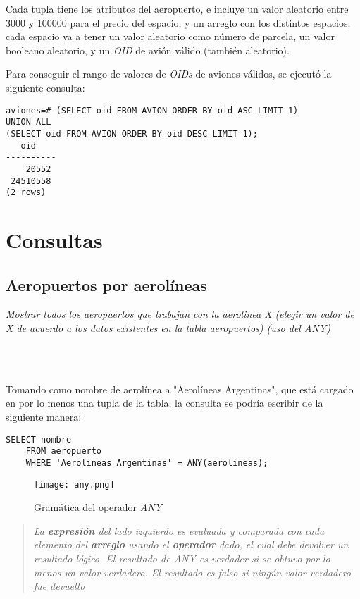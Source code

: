 Cada tupla tiene los atributos del aeropuerto, e incluye un valor aleatorio entre 3000 y 100000 para el precio del espacio, y un arreglo con los distintos espacios; cada espacio va a tener un valor aleatorio como número de parcela, un valor booleano aleatorio, y un \emph{OID} de avión válido (también aleatorio).

Para conseguir el rango de valores de \emph{OIDs} de aviones válidos, se ejecutó la siguiente consulta:  

\vspace*{5mm}
\lstset{style=sql}
\begin{lstlisting}
aviones=# (SELECT oid FROM AVION ORDER BY oid ASC LIMIT 1)
UNION ALL 
(SELECT oid FROM AVION ORDER BY oid DESC LIMIT 1);
   oid    
----------
    20552
 24510558
(2 rows)
\end{lstlisting}


\section{Consultas}

\subsection{Aeropuertos por aerolíneas}
\emph{Mostrar todos los aeropuertos que trabajan con la aerolinea X (elegir un valor de X de acuerdo a los datos existentes en la tabla aeropuertos) (uso del ANY)} 

\\~

Tomando como nombre de aerolínea a "Aerolíneas Argentinas", que está cargado en por lo menos una tupla de la tabla, la consulta se podría escribir de la siguiente manera:

\vspace*{5mm}
\lstset{style=sql}
\begin{lstlisting}
SELECT nombre
    FROM aeropuerto 
    WHERE 'Aerolineas Argentinas' = ANY(aerolineas);
\end{lstlisting}

\begin{figure}[H]
    \texttt{[image: any.png]}
    \caption{Gramática del operador \emph{ANY} \cite{any}}
\end{figure}

\begin{quote}\itshape
    La \textbf{expresión} del lado izquierdo es evaluada y comparada con cada elemento del \textbf{arreglo} usando el \textbf{operador} dado, el cual debe devolver un resultado lógico. El resultado de \emph{ANY} es verdader si se obtuvo por lo menos un valor verdadero. El resultado es falso si ningún valor verdadero fue devuelto \cite{any}    
\end{quote}

